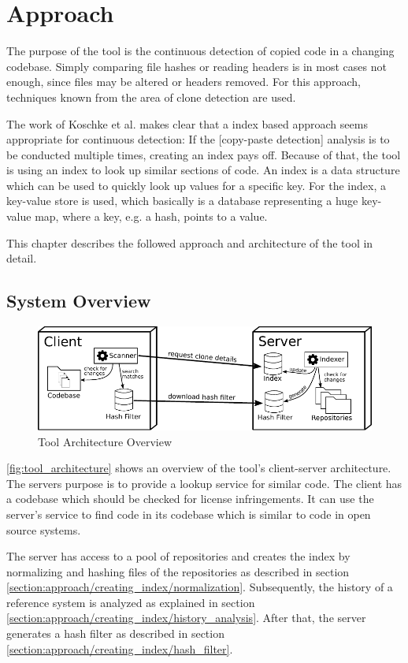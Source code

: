 
\chapter{Approach}\label{chapter:approach}
The purpose of the tool is the continuous detection of copied code in a changing codebase.
Simply comparing file hashes or reading headers is in most cases not enough, since files may be altered or headers removed.
For this approach, techniques known from the area of clone detection are used.

The work of Koschke et al. makes clear that a index based approach seems appropriate for continuous detection:
\glqq If the [copy-paste detection] analysis is to be conducted multiple times, creating an index pays off\grqq \cite{koschke2014large}.
Because of that, the tool is using an index to look up similar sections of code.
An index is a data structure which can be used to quickly look up values for a specific key.
For the index, a key-value store is used, which basically is a database representing a huge key-value map, where a key, e.g. a hash, points to a value.

This chapter describes the followed approach and architecture of the tool in detail.

\section{System Overview}
\begin{figure}[h]
	\centering
	\includegraphics{figures/architecture_overview.pdf}
	\caption{Tool Architecture Overview}\label{fig:tool_architecture}
\end{figure}
\autoref{fig:tool_architecture} shows an overview of the tool's client-server architecture.
The servers purpose is to provide a lookup service for similar code.
The client has a codebase which should be checked for license infringements.
It can use the server's service to find code in its codebase which is similar to code in open source systems.

The server has access to a pool of repositories and creates the index by normalizing and hashing files of the repositories as described in section \ref{section:approach/creating_index/normalization}.
Subsequently, the history of a reference system is analyzed as explained in section \ref{section:approach/creating_index/history_analysis}.
After that, the server generates a hash filter as described in section \ref{section:approach/creating_index/hash_filter}.

